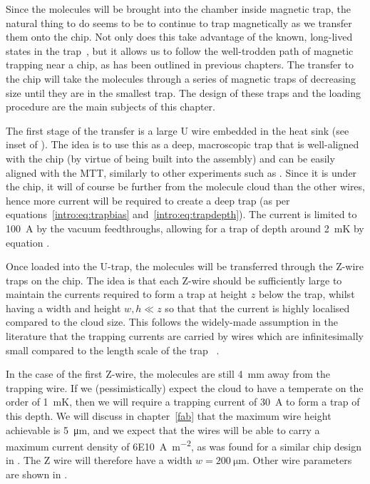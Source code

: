 Since the molecules will be brought into the chamber inside magnetic trap,
the natural thing to do seems to be to continue to trap magnetically as we
transfer them onto the chip. Not only does this take advantage of the known,
long-lived \CaF{} states in the trap~\cite{Williams2018}, but it allows us to
follow the well-trodden path of magnetic trapping near a chip, as has been
outlined in previous chapters.  The transfer to the chip will take the
molecules through a series of magnetic traps of decreasing size until they are
in the smallest trap. The design of these traps and the loading
procedure are the main subjects of this chapter.

The first stage of the transfer is a large U wire embedded in the heat sink
(see inset of ).  The idea is to use this
as a deep, macroscopic trap that is well-aligned with the chip (by virtue of
being built into the assembly) and can be easily aligned with the MTT,
similarly to other experiments such as .  Since it is under
the chip, it will of course be further from the molecule cloud than the other
wires, hence more current will be required to create a deep trap (as per
equations~\ref{intro:eq:trapbias} and~\ref{intro:eq:trapdepth}). The current is
limited to \SI{100}{\ampere} by the vacuum feedthroughs, allowing for a trap of
depth around \SI{2}{\milli\kelvin} by equation .

Once loaded into the U-trap, the molecules will be transferred through the
Z-wire traps on the chip. The idea is that each Z-wire should be sufficiently
large to maintain the currents required to form a trap at height $z$ below the
trap, whilst having a width and height  $w, h \ll z$ so that that the current
is highly localised compared to the cloud size.  This follows the widely-made
assumption in the literature that the trapping currents are carried by wires
which are infinitesimally small compared to the length scale of the trap
~\cite{2011Ac}.

In the case of the first Z-wire, the molecules are still \SI{4}{\milli\meter}
away from the trapping wire. If we (pessimistically) expect the cloud to have a
temperate on the order of \SI{1}{\milli\kelvin}, then we will require a
trapping current of \SI{30}{\ampere} to form a trap of this depth.  We will
discuss in chapter~\ref{fab} that the maximum wire height achievable is
\SI{5}{\micro\meter}, and we expect that the wires will be able to carry a
maximum current density of \SI{6E10}{\ampere\per\meter\squared}, as was found
for a similar chip design in . The Z wire will
therefore have a width $w=\SI{200}{\micro\meter}$. Other wire parameters are
shown in .

